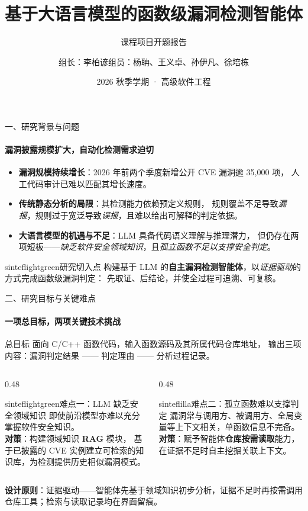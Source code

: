 \documentclass{beamer}
\title{基于大语言模型的函数级漏洞检测智能体}
\subtitle{课程项目开题报告}
\author{组长：李柏谚\quad 组员：杨聃、王义卓、孙伊凡、徐培栋}
\date{2026 秋季学期 · 高级软件工程}
\begin{document}
\maketitle

\begin{frame}{一、研究背景与问题}
\framesubtitle{漏洞披露规模扩大，自动化检测需求迫切}
\small
\begin{itemize}
\item \textbf{漏洞规模持续增长}：2026 年前两个季度新增公开 CVE 漏洞逾 \alert{35{,}000} 项，
      人工代码审计已难以匹配其增长速度。
\item \textbf{传统静态分析的局限}：其检测能力依赖预定义规则，
      规则覆盖不足导致\emph{漏报}，规则过于宽泛导致\emph{误报}，且难以给出可解释的判定依据。
\item \textbf{大语言模型的机遇与不足}：LLM 具备代码语义理解与推理潜力，
      但仍存在两项短板——\emph{缺乏软件安全领域知识}，且\emph{孤立函数不足以支撑安全判定}。
\end{itemize}
\vspace{0.2em}
\begin{colorblock}[black]{sinteflightgreen}{研究切入点}
构建基于 LLM 的\textbf{自主漏洞检测智能体}，以\emph{证据驱动}的方式完成函数级漏洞判定：
先取证、后结论，并使全过程可追溯、可复核。
\end{colorblock}
\end{frame}

\begin{frame}{二、研究目标与关键难点}
\framesubtitle{一项总目标，两项关键技术挑战}
\small
\begin{block}{总目标}
面向 C/C++ 函数代码，输入函数源码及其所属代码仓库地址，
输出三项内容：\alert{漏洞判定结果} —— \alert{判定理由} —— \alert{分析过程记录}。
\end{block}
\begin{columns}[t]
\begin{column}{0.48\textwidth}
\begin{colorblock}[black]{sinteflightgreen}{难点一：LLM 缺乏安全领域知识}
即使前沿模型亦难以充分掌握软件安全知识。\\
\textbf{对策}：构建领域知识 \textbf{RAG} 模块，
基于已披露的 CVE 实例建立可检索的知识库，为检测提供历史相似漏洞模式。
\end{colorblock}
\end{column}
\begin{column}{0.48\textwidth}
\begin{colorblock}[white]{sinteflilla}{难点二：孤立函数难以支撑判定}
漏洞常与调用方、被调用方、全局变量等上下文相关，单函数信息不完备。\\
\textbf{对策}：赋予智能体\textbf{仓库按需读取}能力，
在证据不足时自主挖掘关联上下文。
\end{colorblock}
\end{column}
\end{columns}
\vspace{0.1em}
{\footnotesize \textbf{设计原则}：证据驱动——智能体先基于领域知识初步分析，证据不足时再按需调用仓库工具；检索与读取记录均在界面留痕。}
\end{frame}
\end{document}

